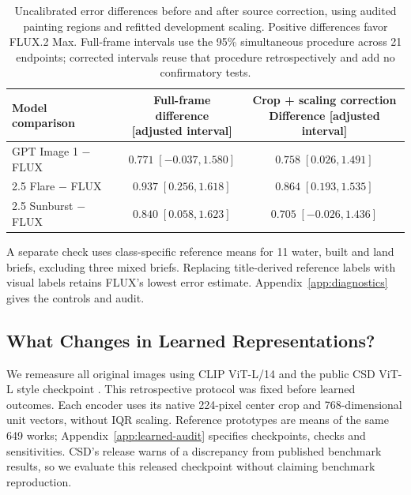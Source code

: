 \begin{table}[!htbp]
\caption{Uncalibrated error differences before and after source correction, using audited painting regions and refitted development scaling. Positive differences favor FLUX.2 Max. Full-frame intervals use the 95\% simultaneous procedure across 21 endpoints; corrected intervals reuse that procedure retrospectively and add no confirmatory tests.}
\label{tab:source-comparison}
\centering\small
\begin{tabularx}{\linewidth}{@{}Xcc@{}}\toprule
Model comparison & \shortstack{Full-frame difference\\{[adjusted interval]}} & \shortstack{Crop + scaling correction\\Difference [adjusted interval]}\\\midrule
GPT Image 1 $-$ FLUX & $0.771\;[-0.037,1.580]$ & $0.758\;[0.026,1.491]$\\[2pt]
2.5 Flare $-$ FLUX & $0.937\;[0.256,1.618]$ & $0.864\;[0.193,1.535]$\\[2pt]
2.5 Sunburst $-$ FLUX & $0.840\;[0.058,1.623]$ & $0.705\;[-0.026,1.436]$\\[2pt]
\bottomrule\end{tabularx}

\end{table}



A separate check uses class-specific reference means for 11 water, built and
land briefs, excluding three mixed briefs. Replacing title-derived reference
labels with visual labels retains FLUX's lowest error estimate.
Appendix~\ref{app:diagnostics} gives the controls and audit.\par



\subsection{What Changes in Learned Representations?}\label{sec:learned-results}
We remeasure all original images using CLIP ViT-L/14 \citep{radford2021}
and the public CSD ViT-L style checkpoint \citep{somepalli2024style}.
This retrospective protocol was fixed before learned outcomes. Each encoder
uses its native 224-pixel center crop and 768-dimensional unit vectors, without
IQR scaling. Reference prototypes are means of the same 649 works;
Appendix~\ref{app:learned-audit} specifies checkpoints, checks and sensitivities.
CSD's release warns of a discrepancy from published benchmark results, so
we evaluate this released checkpoint without claiming benchmark reproduction.

